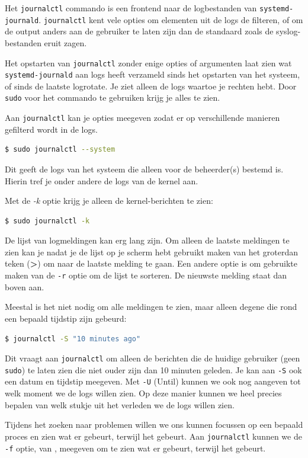 Het \texttt{journalctl} commando is een frontend naar de logbestanden van \texttt{systemd-journald}. \texttt{journalctl} kent vele opties om elementen uit de logs de filteren, of om de output anders aan de gebruiker te laten zijn dan de standaard zoals de syslog-bestanden eruit zagen.

Het opstarten van \texttt{journalctl} zonder enige opties of argumenten laat zien wat \texttt{systemd-journald} aan logs heeft verzameld sinds het opstarten van het systeem, of sinds de laatste logrotate. Je ziet alleen de logs waartoe je rechten hebt. Door \texttt{sudo} voor het commando te gebruiken krijg je alles te zien.

Aan \texttt{journalctl} kan je opties meegeven zodat er op verschillende manieren gefilterd wordt in de logs.
\begin{lstlisting}[language=bash]
$ sudo journalctl --system
\end{lstlisting}
Dit geeft de logs van het systeem die alleen voor de beheerder(s) bestemd is. Hierin tref je onder andere de logs van de kernel aan.

Met de \textit{-k} optie krijg je alleen de kernel-berichten te zien:
\begin{lstlisting}[language=bash]
$ sudo journalctl -k
\end{lstlisting}

De lijst van logmeldingen kan erg lang zijn. Om alleen de laatste meldingen te zien kan je nadat je de lijst op je scherm hebt gebruikt maken van het groterdan teken (\textbf{>}) om naar de laatste melding te gaan. Een andere optie is om gebruikte maken van de \texttt{-r} optie om de lijst  te sorteren. De nieuwste melding staat dan boven aan.

Meestal is het niet nodig om alle meldingen te zien, maar alleen degene die rond een bepaald tijdstip zijn gebeurd:
\begin{lstlisting}[language=bash]
$ journalctl -S "10 minutes ago"
\end{lstlisting}
Dit vraagt aan \texttt{journalctl} om alleen de berichten die de huidige gebruiker (geen \texttt{sudo}) te laten zien die niet ouder zijn dan 10 minuten geleden. Je kan aan \texttt{-S} ook een datum en tijdstip meegeven. Met \texttt{-U} (Until) kunnen we ook nog aangeven tot welk moment we de logs willen zien. Op deze manier kunnen we heel precies bepalen van welk stukje uit het verleden we de logs willen zien.

Tijdens het zoeken naar problemen willen we ons kunnen focussen op een bepaald proces en zien wat er gebeurt, terwijl het gebeurt. Aan \texttt{journalctl} kunnen we de \texttt{-f} optie, van , meegeven om te zien wat er gebeurt, terwijl het gebeurt.

